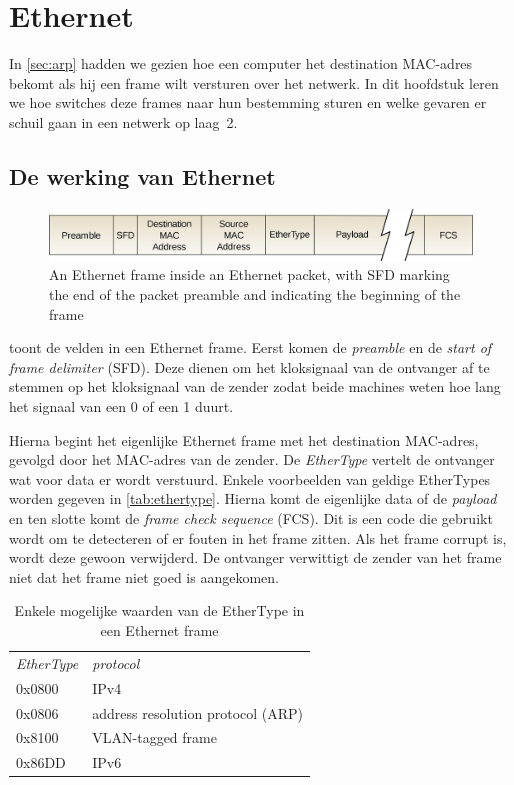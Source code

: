 \chapter{Ethernet}
\label{sec:ethernet}

In \vref{sec:arp} hadden we gezien hoe een computer het destination MAC-adres bekomt als hij een frame wilt versturen over het netwerk.
In dit hoofdstuk leren we hoe switches deze frames naar hun bestemming sturen en welke gevaren er schuil gaan in een netwerk op laag~2.

\section{De werking van Ethernet}


\begin{figure}[hbp]
    \centering
    \includegraphics[width=\textwidth]{images/Ethernet_frame.png}
    \caption{An Ethernet frame inside an Ethernet packet, with SFD marking the end of the packet preamble and indicating the beginning of the frame}
    \label{fig:ethernet-frame}
\end{figure}


 toont de velden in een Ethernet frame.
Eerst komen de \emph{preamble} en de \emph{start of frame delimiter} (SFD).
Deze dienen om het kloksignaal van de ontvanger af te stemmen op het kloksignaal van de zender zodat beide machines weten hoe lang het signaal van een 0 of een 1 duurt.

Hierna begint het eigenlijke Ethernet frame met het destination MAC-adres, gevolgd door het MAC-adres van de zender.
De \emph{EtherType} vertelt de ontvanger wat voor data er wordt verstuurd.
Enkele voorbeelden van geldige EtherTypes worden gegeven in \vref{tab:ethertype}.
Hierna komt de eigenlijke data of de \emph{payload} en ten slotte komt de \emph{frame check sequence} (FCS).
Dit is een code die gebruikt wordt om te detecteren of er fouten in het frame zitten.
Als het frame corrupt is, wordt deze gewoon verwijderd.
De ontvanger verwittigt de zender van het frame niet dat het frame niet goed is aangekomen.

\begin{table}[htp]
    \centering
    \begin{tabular}{ll}
    \textit{EtherType} & \textit{protocol} \\[1ex]
    0x0800 & IPv4 \\
    0x0806 & address resolution protocol (ARP) \\
    0x8100 & VLAN-tagged frame \\
    0x86DD & IPv6 \\
    \end{tabular}
    \caption{Enkele mogelijke waarden van de EtherType in een Ethernet frame}
    \label{tab:ethertype}
\end{table}


